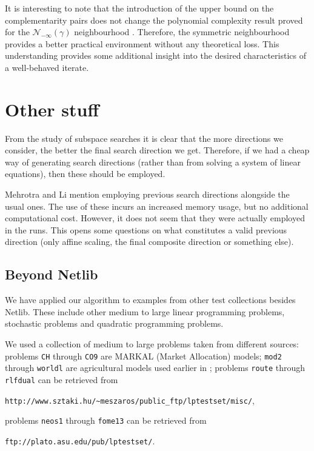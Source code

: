 It is interesting to note that the introduction of the upper bound 
on the complementarity pairs does not change the polynomial complexity 
result proved for the $\mathcal{N}_{-\infty}(\gamma)$ neighbourhood 
\cite[Theorem~5.12]{ipm:Wright97}. Therefore, the symmetric 
neighbourhood provides a better practical environment without any 
theoretical loss. This understanding provides some additional 
insight into the desired characteristics of a well-behaved iterate.

%
%
\section{Other stuff}


\begin{remark}
From the study of subspace searches it is clear that the more 
directions we consider, the better the final search direction 
we get. Therefore, if we had a cheap way of generating search
directions (rather than from solving a system of linear equations),
then these should be employed.
\end{remark}

\begin{remark}
Mehrotra and Li \cite{MehrotraLi} mention employing previous search
directions alongside the usual ones. The use of these incurs an
increased memory usage, but no additional computational cost.
However, it does not seem that they were actually employed in
the runs. This opens some questions on what constitutes a valid
previous direction (only affine scaling, the final composite direction
or something else).
\end{remark}

%
%
\subsection{Beyond Netlib}
\label{BN-tests}

We have applied our algorithm to examples from other test collections 
besides Netlib.
These include other medium to large linear programming problems, 
stochastic problems and quadratic programming problems.

We used a collection of medium to large problems taken from different
sources: problems {\tt CH} through {\tt CO9}
are MARKAL (Market Allocation) models; {\tt mod2} through {\tt worldl} are
agricultural models used earlier in \cite{Gondzio96}; problems {\tt route}
through {\tt rlfdual} can be retrieved from 
\begin{center}
{\tt http://www.sztaki.hu/\~{}meszaros/public\_ftp/lptestset/misc/},
\end{center}
problems {\tt neos1} through {\tt fome13} can be retrieved from 
\begin{center}
{\tt ftp://plato.asu.edu/pub/lptestset/}.
\end{center}

